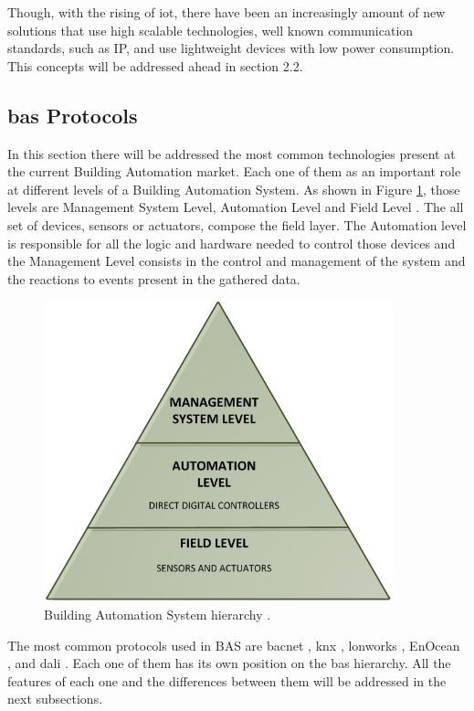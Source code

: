 Though, with the rising of \ac{iot}, there have been an increasingly amount of new solutions that use high scalable technologies, well known communication standards, such as IP,  and use lightweight devices with low power consumption. This concepts will be addressed ahead in section 2.2.


\subsection{\ac{bas} Protocols}

In this section there will be addressed the most common technologies present at the current Building Automation market. Each one of them as an important role at different levels of a Building Automation System. As shown in Figure \ref{fig:hierarchy}, those levels are Management System Level, Automation Level and Field Level \cite{Iwayemi2011}. The all set of devices, sensors or actuators, compose the field layer. The Automation level is responsible for all the logic and hardware needed to control those devices and the Management Level consists in the control and management of the system and the reactions to events present in the gathered data.

\begin{figure}[H]
	\centering
	\includegraphics[width=0.9\textwidth]{figures/hierarchy.png}
	\caption{Building Automation System hierarchy \cite{kastener}. }
	\label{fig:hierarchy}
\end{figure}

The most common protocols used in BAS are \acf{bacnet} \cite{bacnet}, \acf{knx} \cite{knx}, \acf{lonworks} \cite{EchelonCorporation2009}, EnOcean \cite{enocean}, and \acf{dali} \cite{dali}. Each one of them has its own position on the \ac{bas} hierarchy. All the features of each one and the differences between them will be addressed in the next subsections.


